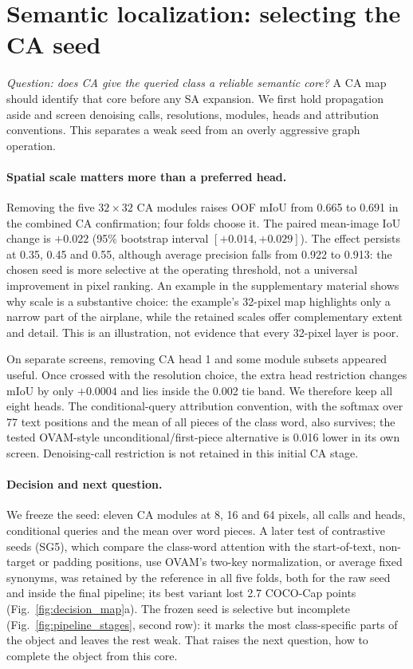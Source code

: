 \section{Semantic localization: selecting the CA seed}
\label{sec:ca}
\emph{Question: does CA give the queried class a reliable semantic core?} A CA map should identify that core before any SA expansion. We first hold propagation aside and screen denoising calls, resolutions, modules, heads and attribution conventions. This separates a weak seed from an overly aggressive graph operation.

\paragraph{Spatial scale matters more than a preferred head.}
Removing the five $32\times32$ CA modules raises OOF mIoU from 0.665 to 0.691 in the combined CA confirmation; four folds choose it. The paired mean-image IoU change is $+0.022$ (95\% bootstrap interval $[+0.014,+0.029]$). The effect persists at 0.35, 0.45 and 0.55, although average precision falls from 0.922 to 0.913: the chosen seed is more selective at the operating threshold, not a universal improvement in pixel ranking. An example in the supplementary material shows why scale is a substantive choice: the example's 32-pixel map highlights only a narrow part of the airplane, while the retained scales offer complementary extent and detail. This is an illustration, not evidence that every 32-pixel layer is poor.

On separate screens, removing CA head 1 and some module subsets appeared useful. Once crossed with the resolution choice, the extra head restriction changes mIoU by only $+0.0004$ and lies inside the 0.002 tie band. We therefore keep all eight heads. The conditional-query attribution convention, with the softmax over 77 text positions and the mean of all pieces of the class word, also survives; the tested OVAM-style unconditional/first-piece alternative is 0.016 lower in its own screen. Denoising-call restriction is not retained in this initial CA stage.

\paragraph{Decision and next question.}
We freeze the seed: eleven CA modules at 8, 16 and 64 pixels, all calls and heads, conditional queries and the mean over word pieces. A later test of contrastive seeds (SG5), which compare the class-word attention with the start-of-text, non-target or padding positions, use OVAM's two-key normalization, or average fixed synonyms, was retained by the reference in all five folds, both for the raw seed and inside the final pipeline; its best variant lost 2.7 COCO-Cap points (Fig.~\ref{fig:decision_map}a). The frozen seed is selective but incomplete (Fig.~\ref{fig:pipeline_stages}, second row): it marks the most class-specific parts of the object and leaves the rest weak. That raises the next question, how to complete the object from this core.

